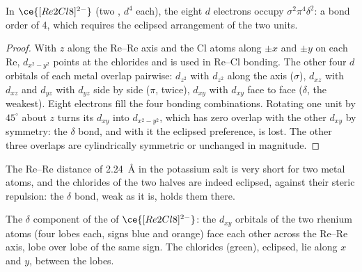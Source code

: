 \begin{proposition}\label{prop:b3:organometallic-bonding:quadruple}
In $\ce{[Re2Cl8]^{2-}}$ (two , $d^4$ each), the eight $d$ electrons occupy $\sigma^2\pi^4\delta^2$: a bond
order of 4, which requires the eclipsed arrangement of the two  units.
\end{proposition}

\begin{proof}
With $z$ along the Re--Re axis and the Cl atoms along $\pm x$ and $\pm y$ on each Re, $d_{x^2-y^2}$
points at the chlorides and is used in Re--Cl bonding. The other four $d$ orbitals
of each metal overlap pairwise: $d_{z^2}$ with $d_{z^2}$ along the axis ($\sigma$), $d_{xz}$ with $d_{xz}$ and $d_{yz}$
with $d_{yz}$ side by side ($\pi$, twice), $d_{xy}$ with $d_{xy}$ face to face ($\delta$, the weakest).
Eight electrons fill the four bonding combinations. Rotating one unit by $45^\circ$
about $z$ turns its $d_{xy}$ into $d_{x^2-y^2}$, which has zero overlap with the other $d_{xy}$ by
symmetry: the $\delta$ bond, and with it the eclipsed preference, is lost. The
other three overlaps are cylindrically symmetric or unchanged in magnitude.
\end{proof}

The Re--Re distance of \qty{2.24}{\angstrom} in the potassium salt is very short for two metal atoms, and the chlorides of the two halves are indeed eclipsed, against
their steric repulsion: the $\delta$ bond, weak as it is, holds them there.

\begin{omfigure}

{\small The $\delta$ component of the  of $\ce{[Re2Cl8]^{2-}}$: the $d_{xy}$ orbitals of
the two rhenium atoms (four lobes each, signs blue and orange) face each other
across the Re--Re axis, lobe over lobe of the same sign. The chlorides (green),
eclipsed, lie along $x$ and $y$, between the lobes.}
\end{omfigure}


